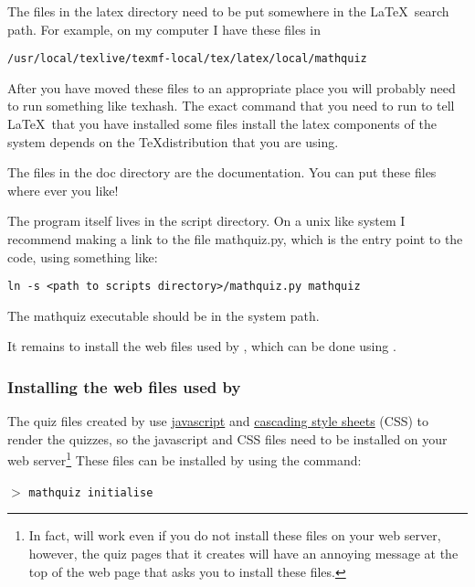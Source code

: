 \documentclass[svgnames]{article}
\newcommand\mathquizopt[1]{\texttt{mathquiz \textemdash\textemdash#1}}
\begin{document}
    The files in the \textsf{latex} directory need to be put somewhere in the \LaTeX\
  search path. For example, on my computer I have these files in

     \Verb|/usr/local/texlive/texmf-local/tex/latex/local/mathquiz|

  After you have moved these files to an appropriate place you will probably need to run
  something like texhash. The exact command that you need to run to tell
  \LaTeX\ that you have installed some files install the latex
  components of the system depends on the \TeX distribution that you are
  using.

  The files in the \textsf{doc} directory are the documentation. You can
  put these files where ever you like!

  The \MathQuiz program itself lives in the script directory. On a unix
  like system I recommend making a link to the file mathquiz.py, which is
  the entry point to the code, using something like:

      \Verb|ln -s <path to scripts directory>/mathquiz.py mathquiz|

  The \textsf{mathquiz} executable should be in the system path.

  It remains to install the web files used by \MathQuiz, which can be
  done using \MathQuiz.
  \fi

  \subsubsection{Installing the web files used by \MathQuiz}
   The quiz files created by \MathQuiz use
   \href{https://en.wikipedia.org/wiki/JavaScript}{javascript} and
   \href{https://www.w3schools.com/css/css_intro.asp}{cascading style
   sheets} (CSS) to render the
   quizzes, so the \MathQuiz javascript and CSS files need to be
   installed on your web server\footnote{In fact, \MathQuiz will work
   even if you do not install these files on your web server, however,
   the quiz pages that it creates will have an annoying message at the
   top of the web page that asks you to install these files.} These
   files can be installed by \MathQuiz using the command:

   $>$ \mathquizopt{initialise}
\end{document}
